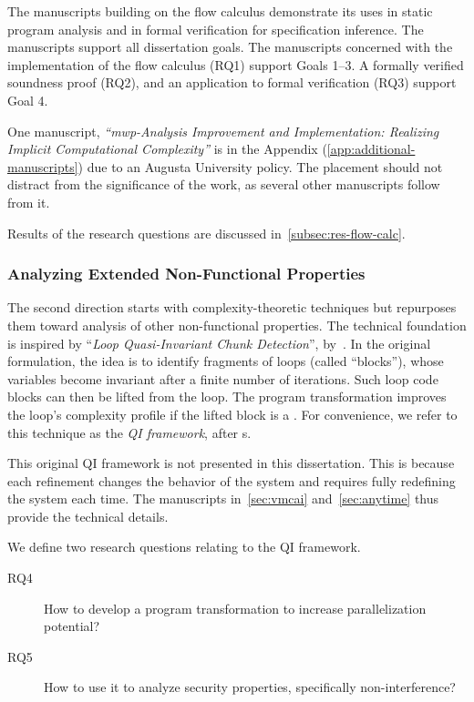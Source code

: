 The manuscripts building on the flow calculus demonstrate its uses in static
program analysis and in formal verification for specification inference. The
manuscripts support all dissertation goals. The manuscripts concerned with the
implementation of the flow calculus (RQ1) support Goals 1--3. A formally
verified soundness proof (RQ2), and an application to formal verification (RQ3)
support Goal 4.

One manuscript, \emph{\enquote{mwp-Analysis Improvement and Implementation:
Realizing Implicit Computational Complexity}} is in the Appendix
(\autoref{app:additional-manuscripts}) due to an Augusta University policy. The
placement should not distract from the significance of the work, as several
other manuscripts follow from it.

Results of the research questions are discussed
in~\autoref{subsec:res-flow-calc}.

\subsubsection{Analyzing Extended Non-Functional Properties}

The second direction starts with complexity-theoretic techniques but repurposes
them toward analysis of other non-functional properties. The technical
foundation is inspired by \enquote{\emph{Loop Quasi-Invariant Chunk Detection}},
by~\textcite{moyen20172}. In the original formulation, the idea is to identify
fragments of loops (called \enquote{blocks}), whose variables become invariant
after a finite number of iterations. Such loop  code blocks
can then be lifted from the loop. The program transformation improves the loop's
complexity profile if the lifted block is a . For convenience,
we refer to this technique as the \emph{QI framework}, after
s.

This original QI framework is not presented in this dissertation. This is
because each refinement changes the behavior of the system and requires fully
redefining the system each time. The manuscripts in~\autoref{sec:vmcai}
and~\autoref{sec:anytime} thus provide the technical details.

We define two research questions relating to the QI framework.

\begin{description}

\item[RQ4] How to develop a program transformation to increase parallelization
potential?

\item[RQ5] How to use it to analyze security properties, specifically
non-interference?

\end{description}

